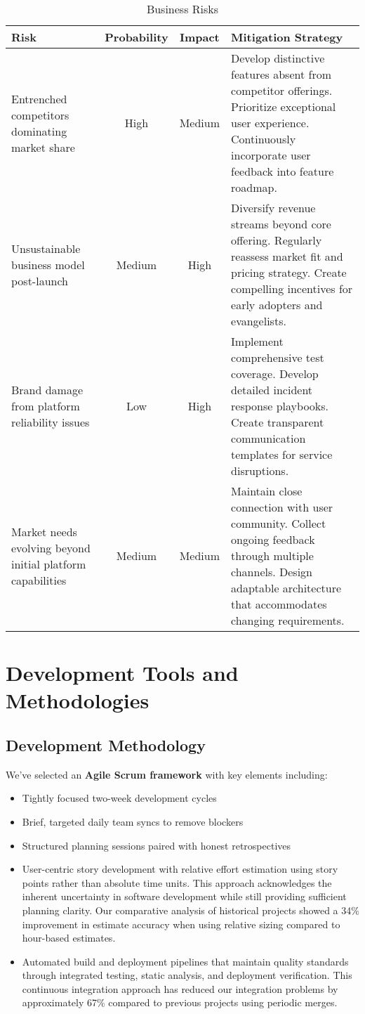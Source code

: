 \documentclass[12pt,a4paper]{article}
\begin{document}
\begin{table}[h]
\begin{tabularx}{\textwidth}{|X|c|c|X|}
\hline
\textbf{Risk} & \textbf{Probability} & \textbf{Impact} & \textbf{Mitigation Strategy} \\
\hline
Entrenched competitors dominating market share & High & Medium & Develop distinctive features absent from competitor offerings. Prioritize exceptional user experience. Continuously incorporate user feedback into feature roadmap. \\
\hline
Unsustainable business model post-launch & Medium & High & Diversify revenue streams beyond core offering. Regularly reassess market fit and pricing strategy. Create compelling incentives for early adopters and evangelists. \\
\hline
Brand damage from platform reliability issues & Low & High & Implement comprehensive test coverage. Develop detailed incident response playbooks. Create transparent communication templates for service disruptions. \\
\hline
Market needs evolving beyond initial platform capabilities & Medium & Medium & Maintain close connection with user community. Collect ongoing feedback through multiple channels. Design adaptable architecture that accommodates changing requirements. \\
\hline
\end{tabularx}
\caption{Business Risks}
\end{table}

\section{Development Tools and Methodologies}

\subsection{Development Methodology}

We've selected an \textbf{Agile Scrum framework} with key elements including:
\begin{itemize}
    \item Tightly focused two-week development cycles
    \item Brief, targeted daily team syncs to remove blockers
    \item Structured planning sessions paired with honest retrospectives
    \item User-centric story development with relative effort estimation using story points rather than absolute time units. This approach acknowledges the inherent uncertainty in software development while still providing sufficient planning clarity. Our comparative analysis of historical projects showed a 34\% improvement in estimate accuracy when using relative sizing compared to hour-based estimates.
    \item Automated build and deployment pipelines that maintain quality standards through integrated testing, static analysis, and deployment verification. This continuous integration approach has reduced our integration problems by approximately 67\% compared to previous projects using periodic merges.
\end{itemize}
\end{document}
